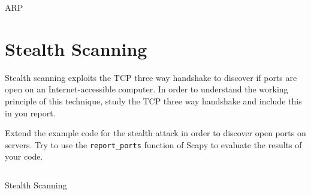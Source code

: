 \documentclass[11pt,a4paper]{article}
\begin{document}
\begin{listing}[h]
    \inputminted{python}{../code_students/example-arp.py}
\caption{ARP}\label{listing:arp-request}
\end{listing}

\FloatBarrier
\section{Stealth Scanning}
Stealth scanning exploits the TCP three way handshake to discover if ports are open on an Internet-accessible computer. In order to understand the working principle of this technique, study the TCP three way handshake and include this in you report.

\begin{question}
Extend the example code for the stealth attack in order to discover open ports on servers.
Try to use the \texttt{report\_ports} function of Scapy to evaluate the results of your code.
\end{question}


\begin{listing}[h]
\inputminted{python}{../code_students/stealth_scanning.py}
\caption{Stealth Scanning}%
\label{listing:stealth-scanning}
\end{listing}
\end{document}
